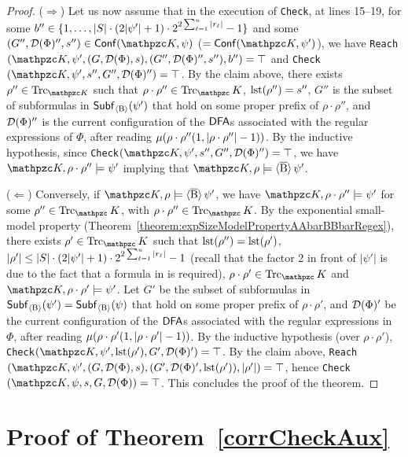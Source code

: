 \begin{proof}
    ($\Rightarrow$)
    Let us now assume that in the execution of \texttt{Check}, at lines 15--19, for some $b''\in\{1,\ldots , |S|\cdot (2|\psi'|+1)\cdot 2^{2\sum_{\ell=1}^u |r_\ell|}-1 \}$ and some $(G'',\Du(\Phi)'',s'')\in\conf(\Ku,\psi)$ ($=\conf(\Ku,\psi')$), we have \texttt{Reach}$(\Ku,\psi',(G,\Du(\Phi),s),(G'',\Du(\Phi)'',s''),\allowbreak b'')=\top$ and \texttt{Check}$(\Ku,\psi',s'',\allowbreak G'',\Du(\Phi)'')=\top$. By the claim above, there exists $\rho''\in\Trk_{\Ku}$ such that $\rho\cdot\rho''\in\Trk_\Ku$, $\operatorname{lst}(\rho'')=s''$, $G''$ is the subset of subformulas in $\mathsf{Subf}_{\operatorname{\langle B\rangle}}(\psi')$ that hold on some proper prefix of $\rho\cdot\rho''$, and $\mathcal{D}(\Phi)''$ is the current configuration of the $\text{\sffamily DFA}$s associated with the regular expressions of $\Phi$, after reading $\mu(\rho\cdot\rho''(1,|\rho\cdot\rho''|-1))$.
%    
    By the inductive hypothesis, since \texttt{Check}$(\Ku,\psi',s'',G'',\Du(\Phi)'')=\top$, we have $\Ku,\rho\cdot\rho''\models \psi'$ implying that $\Ku,\rho\models \hsBt\psi'$.
    
    ($\Leftarrow$)
    Conversely, if $\Ku,\rho\models \hsBt\psi'$, we have $\Ku,\rho\cdot\rho''\models \psi'$ for some $\rho''\in\Trk_\Ku$, with $\rho\cdot\rho''\in\Trk_\Ku$. By the exponential small-model property (Theorem~\ref{theorem:expSizeModelPropertyAAbarBBbarRegex}), there exists $\rho'\in\Trk_\Ku$ such that $\operatorname{lst}(\rho'')=\operatorname{lst}(\rho')$, $|\rho'|\leq |S|\cdot (2|\psi'|+1)\cdot 2^{2\sum_{\ell=1}^u |r_\ell|}-1$ (recall that the factor 2 in front of $|\psi'|$ is due to the fact that 
    a formula in \nnf{} is required), $\rho\cdot\rho'\in\Trk_\Ku$ and $\Ku,\rho\cdot\rho'\models \psi'$. Let $G'$ be the subset of subformulas in $\mathsf{Subf}_{\operatorname{\langle B\rangle}}(\psi')=\mathsf{Subf}_{\operatorname{\langle B\rangle}}(\psi)$ that hold on some proper prefix of $\rho\cdot\rho'$, and $\mathcal{D}(\Phi)'$ be the current configuration of the $\text{\sffamily DFA}$s associated with the regular expressions in $\Phi$, after reading $\mu(\rho\cdot\rho'(1,|\rho\cdot\rho'|-1))$. By the inductive hypothesis (over $\rho\cdot\rho'$), \texttt{Check}$(\Ku,\psi',\lst(\rho'),G',\Du(\Phi)')=\top$.
    By the claim above, \texttt{Reach}$(\Ku,\psi',(G,\Du(\Phi),s), (G',\Du(\Phi)',\lst(\rho')),\allowbreak |\rho'|)=\top$, hence \texttt{Check}$(\Ku,\psi,s,G,\Du(\Phi))=\top$.
    This concludes the proof of the theorem.
\end{proof}


\section{Proof of Theorem~\ref{corrCheckAux}}\label{proof:corrCheckAux}

